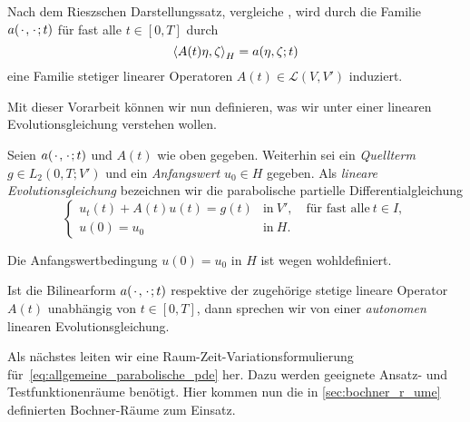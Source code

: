 Nach dem Rieszschen Darstellungssatz, vergleiche \cite[Theorem \S{}22.1]{Halmos:1957vd}, wird durch die Familie $a({\mkern2mu\cdot\mkern2mu}, {\mkern2mu\cdot\mkern2mu}; t)$ für fast alle $t \in [0, T]$ durch
\begin{equation}
    \left\langle A(t)\eta,\zeta\right\rangle_{H} = a(\eta, \zeta; t)
\end{equation}
eine Familie stetiger linearer Operatoren $A(t) \in \mathcal L(V, V')$ induziert.

Mit dieser Vorarbeit können wir nun definieren, was wir unter einer linearen Evolutionsgleichung verstehen wollen.

\begin{Definition}
\label{definition:lineare_evolutionsgleichung}
    Seien $a({\mkern2mu\cdot\mkern2mu}, {\mkern2mu\cdot\mkern2mu}; t)$ und $A(t)$ wie oben gegeben.
    Weiterhin sei ein \emph{Quellterm} $g \in L_{2}(0, T; V')$ und ein \emph{Anfangswert} $u_{0} \in H$ gegeben.
    Als \emph{lineare Evolutionsgleichung} bezeichnen wir die parabolische partielle Differentialgleichung
    \begin{equation}
        \label{eq:allgemeine_parabolische_pde}
        \begin{cases}
            u_{t}(t) + A(t) u(t) = g(t)     &\text{in}~V', \quad \text{für fast alle}~t \in I, \\
            u(0) = u_{0}                    &\text{in}~H.
        \end{cases}
    \end{equation}
\end{Definition}

\begin{Bemerkung}
\leavevmode
\begin{thmenumerate}
    \item Die Anfangswertbedingung $u(0) = u_{0}$ in $H$ ist wegen  wohldefiniert.
    \item Ist die Bilinearform $a({\mkern2mu\cdot\mkern2mu}, {\mkern2mu\cdot\mkern2mu}; t)$ respektive der zugehörige stetige lineare Operator $A(t)$ unabhängig von $t \in [0, T]$, dann sprechen wir von einer \emph{autonomen} linearen Evolutionsgleichung.
\end{thmenumerate}
\end{Bemerkung}

Als nächstes leiten wir eine Raum-Zeit-Variationsformulierung für~\eqref{eq:allgemeine_parabolische_pde} her.
Dazu werden geeignete Ansatz- und Testfunktionenräume benötigt.
Hier kommen nun die in \autoref{sec:bochner_r_ume} definierten Bochner-Räume zum Einsatz.

